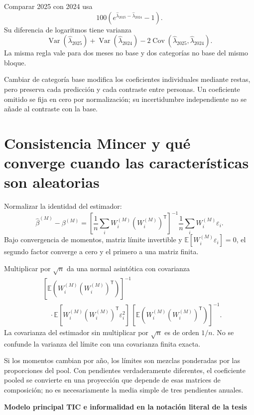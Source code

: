 \documentclass[11pt,a4paper]{article}
\newcommand{\E}{\mathbb E}
\DeclareMathOperator{\Var}{Var}
\DeclareMathOperator{\Cov}{Cov}
\begin{document}
Comparar 2025 con 2024 usa
\[
100(e^{\widehat\lambda_{2025}-\widehat\lambda_{2024}}-1).
\]
Su diferencia de logaritmos tiene varianza
\[
\Var(\widehat\lambda_{2025})+\Var(\widehat\lambda_{2024})
-2\Cov(\widehat\lambda_{2025},\widehat\lambda_{2024}).
\]
La misma regla vale para dos meses no base y dos categorías no base del mismo bloque.

Cambiar de categoría base modifica los coeficientes individuales mediante restas, pero preserva cada predicción y cada contraste entre personas. Un coeficiente omitido se fija en cero por normalización; su incertidumbre independiente no se añade al contraste con la base.

\clearpage
\section{Consistencia Mincer y qué converge cuando las características son aleatorias}

Normalizar la identidad del estimador:
\[
\widehat\beta^{(M)}-\beta^{(M)}
=\left[\frac1n\sum_iW_i^{(M)}(W_i^{(M)})^{\mathsf T}\right]^{-1}
\frac1n\sum_iW_i^{(M)}\varepsilon_i.
\]
Bajo convergencia de momentos, matriz límite invertible y $\E[W_i^{(M)}\varepsilon_i]=0$, el segundo factor converge a cero y el primero a una matriz finita.

Multiplicar por $\sqrt n$ da una normal asintótica con covarianza
\[
\begin{aligned}
&[\E(W_i^{(M)}(W_i^{(M)})^{\mathsf T})]^{-1}\\
&\quad\cdot\E[W_i^{(M)}(W_i^{(M)})^{\mathsf T}\varepsilon_i^2]\,
[\E(W_i^{(M)}(W_i^{(M)})^{\mathsf T})]^{-1}.
\end{aligned}
\]
La covarianza del estimador sin multiplicar por $\sqrt n$ es de orden $1/n$. No se confunde la varianza del límite con una covarianza finita exacta.

Si los momentos cambian por año, los límites son mezclas ponderadas por las proporciones del pool. Con pendientes verdaderamente diferentes, el coeficiente pooled se convierte en una proyección que depende de esas matrices de composición; no es necesariamente la media simple de tres pendientes anuales.

\clearpage
{}
{\large\bfseries\color{azul}Modelo principal TIC e informalidad en la notación literal de la tesis}\par\vspace{2mm}
\end{document}
